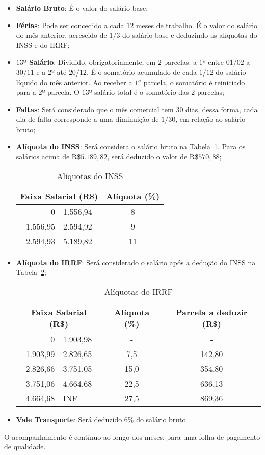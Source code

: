 \documentclass [12pt]{article}
\begin{document}
	\begin{itemize}
		\item \textbf{Salário Bruto}: É o valor do salário base;
		\item \textbf{Férias}: Pode ser concedido a cada $12$ meses de trabalho. É o valor do salário do mês anterior, acrescido de $1/3$ do salário base e deduzindo as alíquotas do INSS e do IRRF;
		\item \textbf{$13º$ Salário}: Dividido, obrigatoriamente, em $2$ parcelas: a $1º$ entre $01/02$ a $30/11$ e a $2º$ até $20/12$. É o somatório acumulado de cada $1/12$ do salário líquido do mês anterior. Ao receber a $1º$ parcela, o somatório é reiniciado para a $2º$ parcela. O $13º$ salário total é o somatório das $2$ parcelas;
		\item \textbf{Faltas}: Será considerado que o mês comercial tem $30$ dias, dessa forma, cada dia de falta corresponde a uma diminuição de $1/30$, em relação ao salário bruto;
		\item \textbf{Alíquota do INSS}: Será considera o salário bruto na Tabela~\ref{tab:aliINSSS}. Para os salários acima de R\$$5.189,82$, será deduzido o valor de R\$$570,88$;
			\begin{table}[h]
				\centering
				\caption{Alíquotas do INSS}
				\label{tab:aliINSSS}
				\begin{tabular}{r@{ - }l|c}
					\hline
					\multicolumn{2}{c|}{Faixa Salarial (R\$)} & Alíquota (\%) \\ \hline\hline
						0                 & 1.556,94 & 8  \\
						1.556,95          & 2.594,92 & 9  \\
						2.594,93          & 5.189,82 & 11 \\ \hline
				\end{tabular}
			\end{table}
		\item \textbf{Alíquota do IRRF}: Será considerado o salário após a dedução do INSS na Tabela~\ref{tab:aliIRRF};
			\begin{table}[h]
				\centering
				\caption{Alíquotas do IRRF}
				\label{tab:aliIRRF}
				\begin{tabular}{r@{ - }l|c|c}
					\hline
					\multicolumn{2}{c|}{Faixa Salarial (R\$)} & Alíquota (\%) & Parcela a deduzir (R\$) \\ \hline
					0                   & 1.903,98            & -             & -                       \\
					1.903,99            & 2.826,65            & 7,5           & 142,80                  \\
					2.826,66            & 3.751,05            & 15,0          & 354,80                  \\
					3.751,06            & 4.664,68            & 22,5          & 636,13                  \\
					4.664,68            & INF                 & 27,5          & 869,36                  \\ \hline
				\end{tabular}
			\end{table}
		\item \textbf{Vale Transporte}: Será deduzido $6\%$ do salário bruto.
	\end{itemize}

	O acompanhamento é contínuo ao longo dos meses, para uma folha de pagamento de qualidade.



\end{document}
